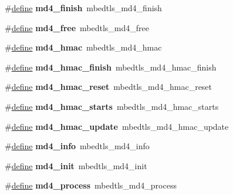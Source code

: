 \begin{DoxyCompactItemize}
\#\hyperlink{structdefine}{define} {\bfseries md4\+\_\+finish}~mbedtls\+\_\+md4\+\_\+finish
\item 
\mbox{\label{compat-1_83_8h_a7df196c174bae1fcabdede49cf8eb5fa}} 
\#\hyperlink{structdefine}{define} {\bfseries md4\+\_\+free}~mbedtls\+\_\+md4\+\_\+free
\item 
\mbox{\label{compat-1_83_8h_aea919c027da709ad09c7fdfb80d72d81}} 
\#\hyperlink{structdefine}{define} {\bfseries md4\+\_\+hmac}~mbedtls\+\_\+md4\+\_\+hmac
\item 
\mbox{\label{compat-1_83_8h_a6965abc90683bdf8502f877d02201832}} 
\#\hyperlink{structdefine}{define} {\bfseries md4\+\_\+hmac\+\_\+finish}~mbedtls\+\_\+md4\+\_\+hmac\+\_\+finish
\item 
\mbox{\label{compat-1_83_8h_af50dbaacf830198d714ec2847fbfb026}} 
\#\hyperlink{structdefine}{define} {\bfseries md4\+\_\+hmac\+\_\+reset}~mbedtls\+\_\+md4\+\_\+hmac\+\_\+reset
\item 
\mbox{\label{compat-1_83_8h_a6eea064bac6382ef510fc0d0a58dd974}} 
\#\hyperlink{structdefine}{define} {\bfseries md4\+\_\+hmac\+\_\+starts}~mbedtls\+\_\+md4\+\_\+hmac\+\_\+starts
\item 
\mbox{\label{compat-1_83_8h_aa6cb1ae0d63cd39e11c206df6448240d}} 
\#\hyperlink{structdefine}{define} {\bfseries md4\+\_\+hmac\+\_\+update}~mbedtls\+\_\+md4\+\_\+hmac\+\_\+update
\item 
\mbox{\label{compat-1_83_8h_abc205cf794a0341577e3a0f79f1f7a7e}} 
\#\hyperlink{structdefine}{define} {\bfseries md4\+\_\+info}~mbedtls\+\_\+md4\+\_\+info
\item 
\mbox{\label{compat-1_83_8h_a256b85df593d411ae557fe193ddf6587}} 
\#\hyperlink{structdefine}{define} {\bfseries md4\+\_\+init}~mbedtls\+\_\+md4\+\_\+init
\item 
\mbox{\label{compat-1_83_8h_ab001f08d9f3590cec7ab0c661fa74f1f}} 
\#\hyperlink{structdefine}{define} {\bfseries md4\+\_\+process}~mbedtls\+\_\+md4\+\_\+process
\item 
\mbox{\label{compat-1_83_8h_aa1337467e10223798819278047bde91a}} 

\end{DoxyCompactItemize}
